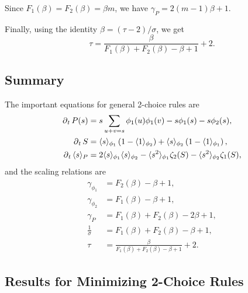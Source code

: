 \documentclass[twoside,10pt]{article}
\begin{document}

\begin{ex}[da Costa]
	Since $F_1(\beta) = F_2(\beta) = \beta m$, we have $\gamma_{P}=2(m-1)\beta+1$.
\end{ex}

Finally, using the identity $\beta = (\tau-2)/\sigma$, we get
\begin{equation}
	\tau = \frac{\beta}{F_1(\beta)+F_2(\beta)-\beta+1} +2.
\end{equation}

\subsection{Summary}

The important equations for general 2-choice rules are
\begin{align*}
	\operatorname{\partial}_{t}{P(s)} &= s \sum_{u+v=s} \phi_1(u) \phi_1(v) - s \phi_1(s) - s\phi_2(s),\\
	\operatorname{\partial}_{t}{S} &= \langle s \rangle_{\phi_1}\left( 1-\langle 1 \rangle_{\phi_2} \right) + \langle s \rangle_{\phi_2}\left( 1-\langle 1 \rangle_{\phi_1} \right),\\
	\operatorname{\partial}_{t}{\langle s \rangle_{P}} &= 2\langle s \rangle_{\phi_1}\langle s \rangle_{\phi_2} - \langle s^2 \rangle_{\phi_1}\zeta_2(S) - \langle s^2 \rangle_{\phi_2}\zeta_1(S),
\end{align*}
and the scaling relations are
\begin{align*}
	\gamma_{\phi_1} &= F_2(\beta) - \beta+1,\\
	\gamma_{\phi_2} &= F_1(\beta)-\beta+1,\\
	\gamma_{P} &= F_1(\beta) + F_2(\beta)-2\beta+1,\\
	\frac{1}{\sigma} &= F_1(\beta)+F_2(\beta)-\beta+1,\\
	\tau &= \frac{\beta}{F_1(\beta)+F_2(\beta)-\beta+1} +2.
\end{align*}

\subsection{Results for Minimizing 2-Choice Rules}
\end{document}
